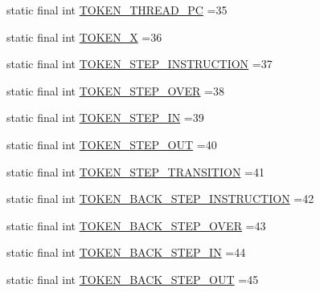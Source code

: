 \begin{DoxyCompactItemize}
\item 
static final int \hyperlink{classgov_1_1nasa_1_1jpf_1_1inspector_1_1client_1_1parser_1_1_console_grammar_parser_aaff98354be1a1583da6fc9387508ca64}{T\+O\+K\+E\+N\+\_\+\+T\+H\+R\+E\+A\+D\+\_\+\+PC} =35
\item 
static final int \hyperlink{classgov_1_1nasa_1_1jpf_1_1inspector_1_1client_1_1parser_1_1_console_grammar_parser_a2e3a8e3d1b5323e752e60b320faa5ab0}{T\+O\+K\+E\+N\+\_\+X} =36
\item 
static final int \hyperlink{classgov_1_1nasa_1_1jpf_1_1inspector_1_1client_1_1parser_1_1_console_grammar_parser_a5d7386e4567131525835f75805a6de54}{T\+O\+K\+E\+N\+\_\+\+S\+T\+E\+P\+\_\+\+I\+N\+S\+T\+R\+U\+C\+T\+I\+ON} =37
\item 
static final int \hyperlink{classgov_1_1nasa_1_1jpf_1_1inspector_1_1client_1_1parser_1_1_console_grammar_parser_a54362c0a5416ae9b077447cf1ed6b8aa}{T\+O\+K\+E\+N\+\_\+\+S\+T\+E\+P\+\_\+\+O\+V\+ER} =38
\item 
static final int \hyperlink{classgov_1_1nasa_1_1jpf_1_1inspector_1_1client_1_1parser_1_1_console_grammar_parser_ae2c7468cbfddbc3e10aab8c7f7a495a2}{T\+O\+K\+E\+N\+\_\+\+S\+T\+E\+P\+\_\+\+IN} =39
\item 
static final int \hyperlink{classgov_1_1nasa_1_1jpf_1_1inspector_1_1client_1_1parser_1_1_console_grammar_parser_ae993568151d457fc60f7e018afb5e391}{T\+O\+K\+E\+N\+\_\+\+S\+T\+E\+P\+\_\+\+O\+UT} =40
\item 
static final int \hyperlink{classgov_1_1nasa_1_1jpf_1_1inspector_1_1client_1_1parser_1_1_console_grammar_parser_adc81516f2fc9313baa559cafe7ea5c79}{T\+O\+K\+E\+N\+\_\+\+S\+T\+E\+P\+\_\+\+T\+R\+A\+N\+S\+I\+T\+I\+ON} =41
\item 
static final int \hyperlink{classgov_1_1nasa_1_1jpf_1_1inspector_1_1client_1_1parser_1_1_console_grammar_parser_ab99720d771726d59ac9362053e31a6f1}{T\+O\+K\+E\+N\+\_\+\+B\+A\+C\+K\+\_\+\+S\+T\+E\+P\+\_\+\+I\+N\+S\+T\+R\+U\+C\+T\+I\+ON} =42
\item 
static final int \hyperlink{classgov_1_1nasa_1_1jpf_1_1inspector_1_1client_1_1parser_1_1_console_grammar_parser_a86096c9148a376aed038eb826c580d81}{T\+O\+K\+E\+N\+\_\+\+B\+A\+C\+K\+\_\+\+S\+T\+E\+P\+\_\+\+O\+V\+ER} =43
\item 
static final int \hyperlink{classgov_1_1nasa_1_1jpf_1_1inspector_1_1client_1_1parser_1_1_console_grammar_parser_a18568b7dc96eef52f3c2042e0497d9a1}{T\+O\+K\+E\+N\+\_\+\+B\+A\+C\+K\+\_\+\+S\+T\+E\+P\+\_\+\+IN} =44
\item 
static final int \hyperlink{classgov_1_1nasa_1_1jpf_1_1inspector_1_1client_1_1parser_1_1_console_grammar_parser_a90de6a3a8324fd0c4e68c51e0a45ff59}{T\+O\+K\+E\+N\+\_\+\+B\+A\+C\+K\+\_\+\+S\+T\+E\+P\+\_\+\+O\+UT} =45

\end{DoxyCompactItemize}
